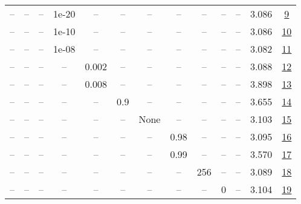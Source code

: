 \begin{table}[H]
\begin{tabular}{ccccccccccccc}
-- & -- & -- & 1e-20 & -- & -- & -- & -- & -- & -- & -- & 3.086 & \href{https://wandb.ai/stanford-mercury/optimizer-scaling/runs/sweep-520m-10B-mudamyd1b748lr0.004-alr0.004-wd0.2-minlr0-warmup5-a91047}{9} \\
-- & -- & -- & 1e-10 & -- & -- & -- & -- & -- & -- & -- & 3.086 & \href{https://wandb.ai/stanford-mercury/optimizer-scaling/runs/sweep-520m-10B-mudamyce33f3lr0.004-alr0.004-wd0.2-minlr0-warmup5-4b8c3f}{10} \\
-- & -- & -- & 1e-08 & -- & -- & -- & -- & -- & -- & -- & 3.082 & \href{https://wandb.ai/stanford-mercury/optimizer-scaling/runs/sweep-520m-10B-mudamwf3440blr0.004-alr0.004-wd0.2-minlr0-warmup5-c6e6f5}{11} \\
-- & -- & -- & -- & 0.002 & -- & -- & -- & -- & -- & -- & 3.088 & \href{https://wandb.ai/stanford-mercury/optimizer-scaling/runs/sweep-520m-10B-mudamvfe13e9lr0.002-alr0.004-wd0.2-minlr0-warmup5-267a5d}{12} \\
-- & -- & -- & -- & 0.008 & -- & -- & -- & -- & -- & -- & 3.898 & \href{https://wandb.ai/stanford-mercury/optimizer-scaling/runs/sweep-520m-10B-mudamvc201e3lr0.008-alr0.004-wd0.2-minlr0-warmup5-160a6d}{13} \\
-- & -- & -- & -- & -- & 0.9 & -- & -- & -- & -- & -- & 3.655 & \href{https://wandb.ai/stanford-mercury/optimizer-scaling/runs/sweep-520m-10B-mudamnf21925lr0.004-alr0.004-wd0.2-minlr0-warmup5-2f4059}{14} \\
-- & -- & -- & -- & -- & -- & None & -- & -- & -- & -- & 3.103 & \href{https://wandb.ai/stanford-mercury/optimizer-scaling/runs/sweep-520m-10B-mudamn4a48b9lr0.004-alr0.004-wd0.2-minlr0-warmup5-7a8fc6}{15} \\
-- & -- & -- & -- & -- & -- & -- & 0.98 & -- & -- & -- & 3.095 & \href{https://wandb.ai/stanford-mercury/optimizer-scaling/runs/sweep-520m-10B-mudamndea316lr0.004-alr0.004-wd0.2-minlr0-warmup5-44602e}{16} \\
-- & -- & -- & -- & -- & -- & -- & 0.99 & -- & -- & -- & 3.570 & \href{https://wandb.ai/stanford-mercury/optimizer-scaling/runs/sweep-520m-10B-mudamnbdcf85lr0.004-alr0.004-wd0.2-minlr0-warmup5-cfecee}{17} \\
-- & -- & -- & -- & -- & -- & -- & -- & 256 & -- & -- & 3.089 & \href{https://wandb.ai/stanford-mercury/optimizer-scaling/runs/sweep-520m-10B-mudamw2efceelr0.004-alr0.004-wd0.2-minlr0-warmup5-684847}{18} \\
-- & -- & -- & -- & -- & -- & -- & -- & -- & 0 & -- & 3.104 & \href{https://wandb.ai/stanford-mercury/optimizer-scaling/runs/sweep-520m-10B-mudamn3b6afclr0.004-alr0.004-wd0.2-minlr0-warmup0-d68e8a}{19} \\

\end{tabular}
\end{table}
